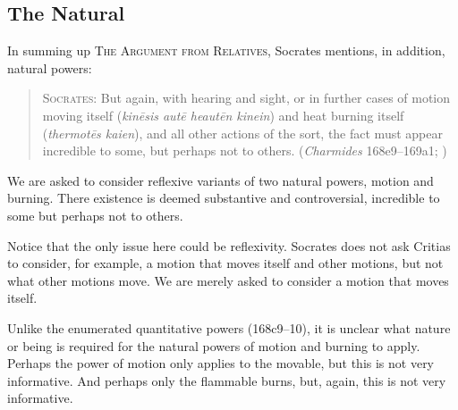 %


\subsection{The Natural} %
\label{sub:the_natural}

In summing up \textsc{The Argument from Relatives}, Socrates mentions, in addition, natural powers:
\begin{quote}
	\textsc{Socrates}: But again, with hearing and sight, or in further cases of motion moving itself (\emph{kinēsis autē heautēn kinein}) and heat burning itself (\emph{thermotēs kaien}), and all other actions of the sort, the fact must appear incredible to some, but perhaps not to others. (\emph{Charmides} 168e9–169a1; \citealt[68]{Lamb:1927qw})
\end{quote}
We are asked to consider reflexive variants of two natural powers, motion and burning. There existence is deemed substantive and controversial, incredible to some but perhaps not to others.

Notice that the only issue here could be reflexivity. Socrates does not ask Critias to consider, for example, a motion that moves itself and other motions, but not what other motions move. We are merely asked to consider a motion that moves itself.

Unlike the enumerated quantitative powers (168c9–10), it is unclear what nature or being is required for the natural powers of motion and burning to apply. Perhaps the power of motion only applies to the movable, but this is not very informative. And perhaps only the flammable burns, but, again, this is not very informative. 


